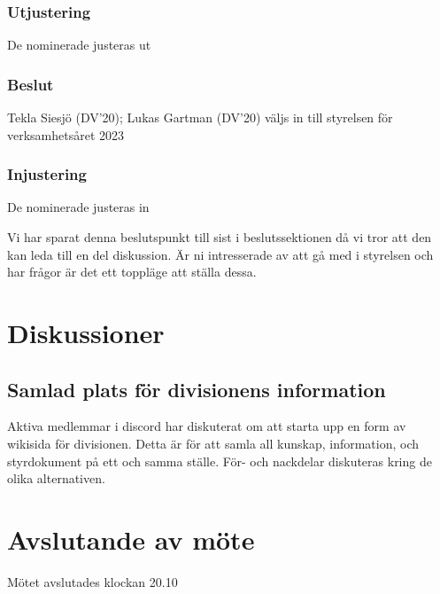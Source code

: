 \documentclass[protokoll]{dvd}
\begin{document}
        \subsubsection*{Utjustering}
        De nominerade justeras ut

        \subsubsection*{Beslut}
            \begin{attsatser}
                \item Tekla Siesjö (DV'20); Lukas Gartman (DV'20) väljs in till styrelsen för verksamhetsåret 2023
            \end{attsatser}

        \subsubsection*{Injustering}
        De nominerade justeras in

Vi har sparat denna beslutspunkt till sist i beslutssektionen då vi tror att den kan leda till
en del diskussion. Är ni intresserade av att gå med i styrelsen och har frågor är det ett toppläge
att ställa dessa.

\newpage

\section{Diskussioner}\label{sec:discussioner}

    \subsection*{Samlad plats för divisionens information}
    Aktiva medlemmar i discord har diskuterat om att starta upp en form av wikisida för divisionen.
    Detta är för att samla all kunskap, information, och styrdokument på ett och samma ställe.
    För- och nackdelar diskuteras kring de olika alternativen.

\section{Avslutande av möte}

Mötet avslutades klockan 20.10

\end{document}
